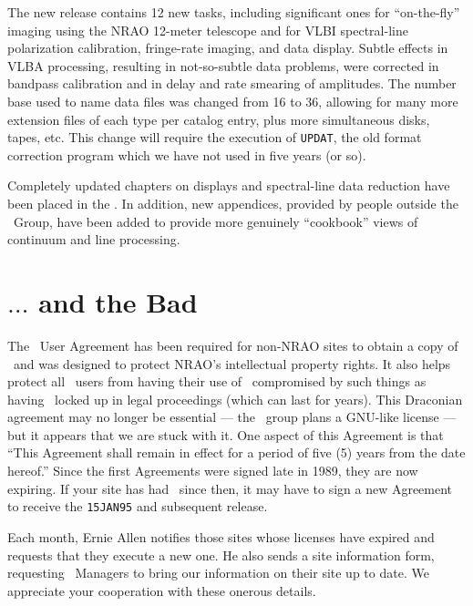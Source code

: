 The new release contains 12 new tasks, including significant ones for
``on-the-fly'' imaging using the NRAO 12-meter telescope and for VLBI
spectral-line polarization calibration, fringe-rate imaging, and data
display.  Subtle effects in VLBA processing, resulting in not-so-subtle
data problems, were corrected in bandpass calibration and in delay and
rate smearing of amplitudes.  The number base used to name data files
was changed from 16 to 36, allowing for many more extension files of
each type per catalog entry, plus more simultaneous disks, tapes, etc.
This change will require the execution of {\tt UPDAT}, the old format
correction program which we have not used in five years (or so).

Completely updated chapters on displays and spectral-line data
reduction have been placed in the \Cookbook.  In addition, new
appendices, provided by people outside the \AIPS\ Group, have been
added to provide more genuinely ``cookbook'' views of continuum and
line processing.

\section{$\ldots$ and the Bad}

The \AIPS\ User Agreement has been required for non-NRAO sites to
obtain a copy of \AIPS\ and was designed to protect NRAO's
intellectual property rights.  It also helps protect all \AIPS\ users
from having their use of \AIPS\ compromised by such things as having
\AIPS\ locked  up in legal proceedings (which can last for years).
This Draconian agreement may no longer be essential --- the \AIPTOO\
group plans a GNU-like license --- but it appears that we are stuck
with it.  One aspect of this Agreement is that ``This Agreement shall
remain in effect for a period of five (5) years from the date
hereof.''  Since the first Agreements were signed late in 1989, they
are now expiring.  If your site has had \AIPS\ since then, it may have
to sign a new Agreement to receive the {\tt 15JAN95} and subsequent
release.

Each month, Ernie Allen notifies those sites whose licenses have
expired and requests that they execute a new one.  He also sends a
site information form, requesting \AIPS\ Managers to bring our
information on their site up to date.  We appreciate your cooperation
with these onerous details.
\vfill\eject

